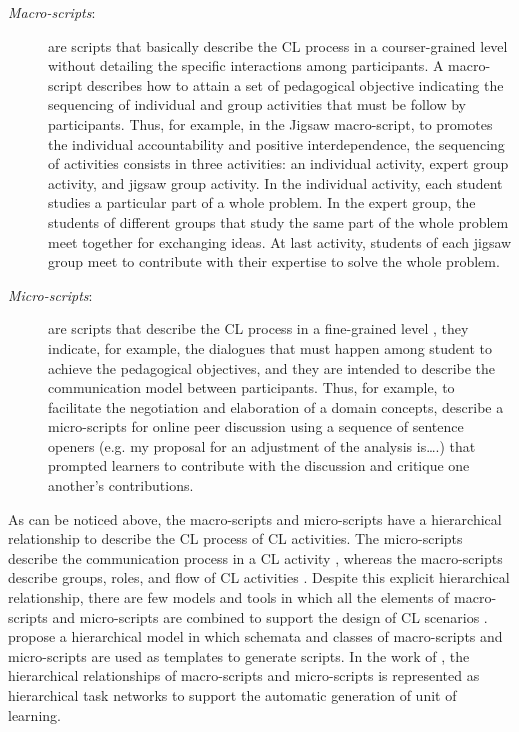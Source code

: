 \begin{description}
\item[\emph{Macro-scripts}:] are scripts that basically describe the CL process in a courser-grained level without detailing the specific interactions among participants. A macro-script describes how to attain a set of pedagogical objective indicating the sequencing of individual and group activities that must be follow by participants. Thus, for example, in the Jigsaw macro-script, to promotes the individual accountability and positive interdependence, the sequencing of activities consists in three activities: an individual activity, expert group activity, and jigsaw group activity. In the individual activity, each student studies a particular part of a whole problem. In the expert group, the students of different groups that study the same part of the whole problem meet together for exchanging ideas. At last activity, students of each jigsaw group meet to contribute with their expertise to solve the whole problem.

\item[\emph{Micro-scripts}:] are scripts that describe the CL process in a fine-grained level \cite{WeinbergerFischerStegmann2005}, they indicate, for example, the dialogues that must happen among student to achieve the pedagogical objectives, and they are intended to describe the communication model between participants. Thus, for example, to facilitate the negotiation and elaboration of a domain concepts,  describe a micro-scripts for online peer discussion using a sequence of sentence openers (e.g. my proposal for an adjustment of the analysis is….) that prompted learners to contribute with the discussion and critique one another's contributions.
\end{description}

As can be noticed above, the macro-scripts and micro-scripts have a hierarchical relationship to describe the CL process of CL activities. The micro-scripts describe the communication process in a CL activity \cite{WeinbergerFischerStegmann2005}, whereas the macro-scripts describe groups, roles, and flow of CL activities \cite{DillenbourgHong2008}. Despite this explicit hierarchical relationship, there are few models and tools in which all the elements of macro-scripts and micro-scripts are combined to support the design of CL scenarios \cite{AlharbiAthaudaChiong2014, ChallcoBittencourtIsotani2016}.  propose a hierarchical model in which schemata and classes of macro-scripts and micro-scripts are used as templates to generate scripts. In the work of , the hierarchical relationships of macro-scripts and micro-scripts is represented as hierarchical task networks to support the automatic generation of unit of learning.

